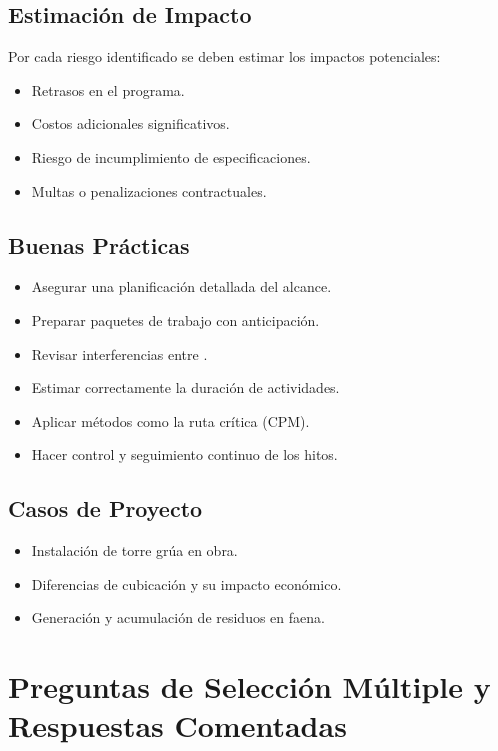 \subsection*{Estimación de Impacto}
Por cada riesgo identificado se deben estimar los impactos potenciales:
\begin{itemize}
    \item Retrasos en el programa.
    \item Costos adicionales significativos.
    \item Riesgo de incumplimiento de especificaciones.
    \item Multas o penalizaciones contractuales.
\end{itemize}

\subsection*{Buenas Prácticas}
\begin{itemize}
    \item Asegurar una planificación detallada del alcance.
    \item Preparar paquetes de trabajo con anticipación.
    \item Revisar interferencias entre .
    \item Estimar correctamente la duración de actividades.
    \item Aplicar métodos como la ruta crítica (CPM).
    \item Hacer control y seguimiento continuo de los hitos.
\end{itemize}

\subsection*{Casos de Proyecto}
\begin{itemize}
    \item Instalación de torre grúa en obra.
    \item Diferencias de cubicación y su impacto económico.
    \item Generación y acumulación de residuos en faena.
\end{itemize}

\newpage
\section{Preguntas de Selección Múltiple y Respuestas Comentadas}

